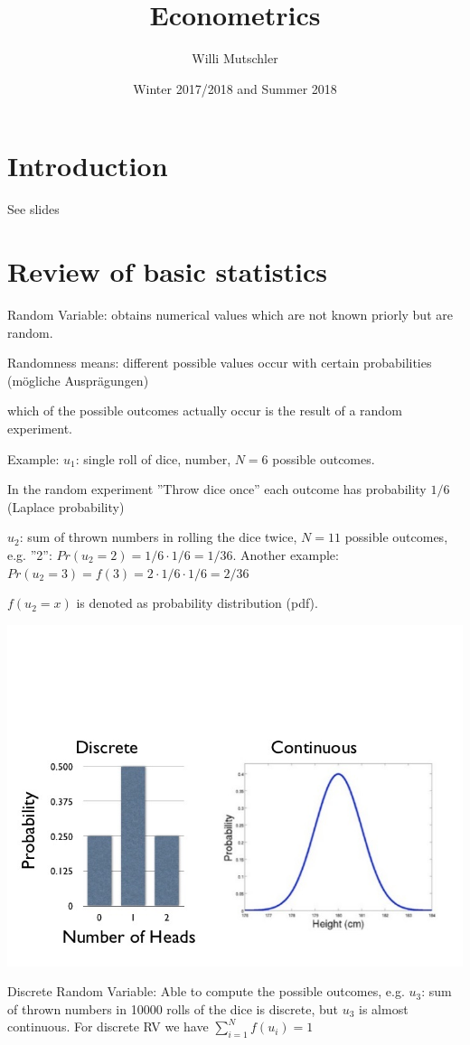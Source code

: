 \documentclass{article}
\begin{document}
\title{Econometrics}
\date{Winter 2017/2018 and Summer 2018}
\author{Willi Mutschler}
\maketitle


\section{Introduction}

See slides

\section{Review of basic statistics}
Random Variable: obtains numerical values which are not known priorly but are random.

Randomness means: different possible values occur with certain probabilities (mögliche Ausprägungen)

which of the possible outcomes actually occur is the result of a random experiment.

Example: $u_1$: single roll of dice, number, $N=6$ possible outcomes.

In the random experiment ''Throw dice once'' each outcome has probability $1/6$ (Laplace probability)

$u_2$: sum of thrown numbers in rolling the dice twice, $N=11$ possible outcomes, e.g. ''2'': $Pr(u_2=2) = 1/6\cdot 1/6 = 1/36$. Another example: $Pr(u_2=3) = f(3)=2\cdot 1/6\cdot 1/6 = 2/36$

$f(u_2=x)$ is denoted as probability distribution (pdf).

\includegraphics[width=.5\textwidth]{plots/pdfs.jpg}

Discrete Random Variable: Able to compute the possible outcomes, e.g. $u_3$: sum of thrown numbers in 10000 rolls of the dice is discrete, but $u_3$ is almost continuous. For discrete RV we have $\sum_{i=1}^{N} f(u_i) = 1$
\end{document}
